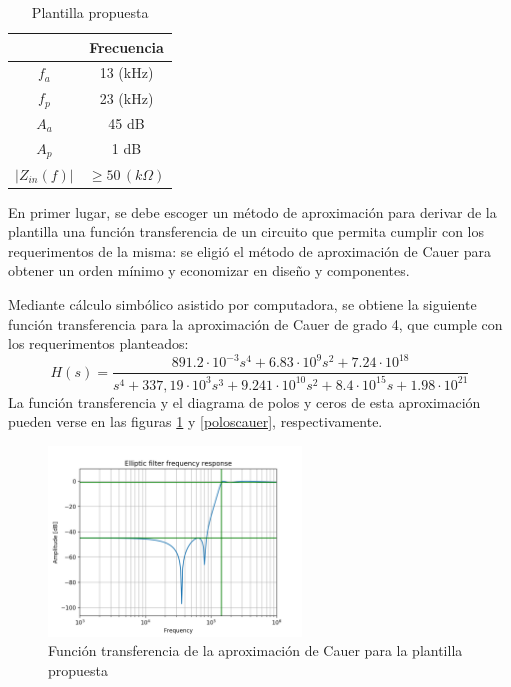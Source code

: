 \documentclass[spanish]{article}
\begin{document}
\begin{table}[H]
\begin{centering}
\begin{tabular}{|c|c|}
\hline 
 & Frecuencia\tabularnewline
\hline 
\hline 
$f_{a}$ & 13 (kHz)\tabularnewline
\hline 
$f_{p}$ & 23 (kHz)\tabularnewline
\hline 
$A_{a}$ & 45 dB\tabularnewline
\hline 
$A_{p}$ & 1 dB\tabularnewline
\hline 
$\left|Z_{in}(f)\right|$ & $\geq50\,(k\Omega)$\tabularnewline
\hline 
\end{tabular}
\par\end{centering}
\caption{Plantilla propuesta}
\label{plantrestrictiva}
\end{table}

En primer lugar, se debe escoger un método de aproximación para derivar de la plantilla  una función transferencia de un circuito que permita cumplir con los requerimentos de la misma: se eligió el método de aproximación de Cauer para obtener un orden mínimo y economizar en diseño y componentes.

Mediante cálculo simbólico asistido por computadora, se obtiene la siguiente función transferencia para la aproximación de Cauer de grado 4, que cumple con los requerimentos planteados:
\[
H(s)=\frac{891.2\cdot10^{-3}s^{4}+6.83\cdot10^{9}s^{2}+7.24\cdot10^{18}}{s^{4}+337,19\cdot10^{3}s^{3}+9.241\cdot10^{10}s^{2}+8.4\cdot10^{15}s+1.98\cdot10^{21}}
\]
La función transferencia y el diagrama de polos y ceros de esta aproximación pueden verse en las figuras \ref{bodecauer} y \ref{poloscauer}, respectivamente. 

\begin{figure}[H]
\begin{centering}
\includegraphics[width=0.6\textwidth]{Resources/cauerbode.png}
\par\end{centering}
\caption{Función transferencia de la aproximación de Cauer para la plantilla propuesta}
\label{bodecauer}
\end{figure}
\end{document}
